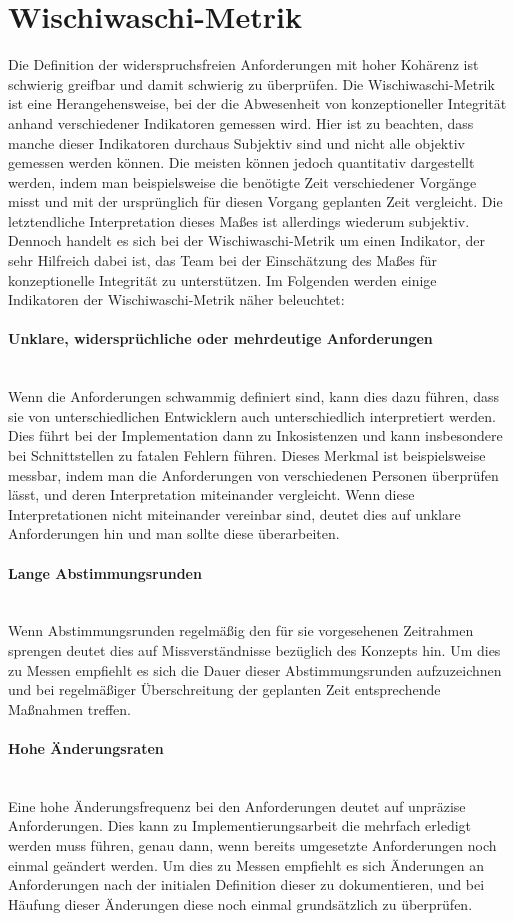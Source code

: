 \documentclass[a4paper, ngerman, 12pt, usenames, dvipsnames]{article}
\begin{document}
\section{Wischiwaschi-Metrik}
Die Definition der widerspruchsfreien Anforderungen mit hoher Kohärenz ist schwierig greifbar und damit schwierig zu überprüfen. Die Wischiwaschi-Metrik ist eine Herangehensweise, bei der die Abwesenheit von konzeptioneller Integrität anhand verschiedener Indikatoren gemessen wird. Hier ist zu beachten, dass manche dieser Indikatoren durchaus Subjektiv sind und nicht alle objektiv gemessen werden können. Die meisten können jedoch quantitativ dargestellt werden, indem man beispielsweise die benötigte Zeit verschiedener Vorgänge misst und mit der ursprünglich für diesen Vorgang geplanten Zeit vergleicht. Die letztendliche Interpretation dieses Maßes ist allerdings wiederum subjektiv. Dennoch handelt es sich bei der Wischiwaschi-Metrik um einen Indikator, der sehr Hilfreich dabei ist, das Team bei der Einschätzung des Maßes für konzeptionelle Integrität zu unterstützen. 
Im Folgenden werden einige Indikatoren der Wischiwaschi-Metrik näher beleuchtet:
\paragraph{Unklare, widersprüchliche oder mehrdeutige Anforderungen}\mbox{} \\
Wenn die Anforderungen schwammig definiert sind, kann dies dazu führen, dass sie von unterschiedlichen Entwicklern auch unterschiedlich interpretiert werden. Dies führt bei der Implementation dann zu Inkosistenzen und kann insbesondere bei Schnittstellen zu fatalen Fehlern führen. Dieses Merkmal ist beispielsweise messbar, indem man die Anforderungen von verschiedenen Personen überprüfen lässt, und deren Interpretation miteinander vergleicht. Wenn diese Interpretationen nicht miteinander vereinbar sind, deutet dies auf unklare Anforderungen hin und man sollte diese überarbeiten. 
\paragraph{Lange Abstimmungsrunden}\mbox{} \\
Wenn Abstimmungsrunden regelmäßig den für sie vorgesehenen Zeitrahmen sprengen deutet dies auf Missverständnisse bezüglich des Konzepts hin. Um dies zu Messen empfiehlt es sich die Dauer dieser Abstimmungsrunden aufzuzeichnen und bei regelmäßiger Überschreitung der geplanten Zeit entsprechende Maßnahmen treffen.
\paragraph{Hohe Änderungsraten}\mbox{} \\
Eine hohe Änderungsfrequenz bei den Anforderungen deutet auf unpräzise Anforderungen. Dies kann zu Implementierungsarbeit die mehrfach erledigt werden muss führen, genau dann, wenn bereits umgesetzte Anforderungen noch einmal geändert werden. Um dies zu Messen empfiehlt es sich Änderungen an Anforderungen nach der initialen Definition dieser zu dokumentieren, und bei Häufung dieser Änderungen diese noch einmal grundsätzlich zu überprüfen.
\end{document}
